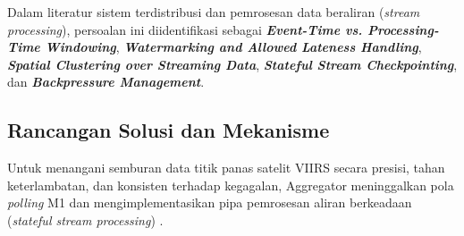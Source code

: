 \noindent Dalam literatur sistem terdistribusi dan pemrosesan data beraliran (\textit{stream processing}), persoalan ini diidentifikasi sebagai \textbf{\textit{Event-Time vs. Processing-Time Windowing}}, \textbf{\textit{Watermarking and Allowed Lateness Handling}}, \textbf{\textit{Spatial Clustering over Streaming Data}}, \textbf{\textit{Stateful Stream Checkpointing}}, dan \textbf{\textit{Backpressure Management}}.

\subsection{Rancangan Solusi dan Mekanisme}
Untuk menangani semburan data titik panas satelit VIIRS secara presisi, tahan keterlambatan, dan konsisten terhadap kegagalan, Aggregator meninggalkan pola \textit{polling} M1 dan mengimplementasikan pipa pemrosesan aliran berkeadaan (\textit{stateful stream processing}) \cite{kleppmann2017designing,akidau2015dataflow}.

